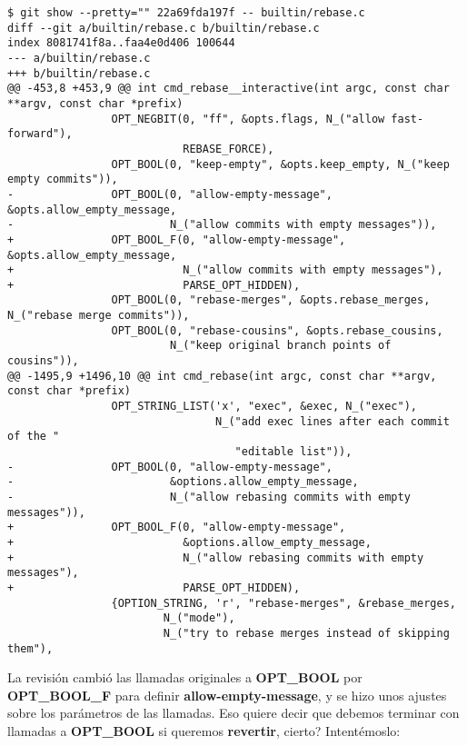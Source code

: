 \begin{lstlisting}[style=console_style,
	basicstyle=\tiny,
	caption={\bf Ejemplo 13} - Revisión original]
$ git show --pretty="" 22a69fda197f -- builtin/rebase.c
diff --git a/builtin/rebase.c b/builtin/rebase.c
index 8081741f8a..faa4e0d406 100644
--- a/builtin/rebase.c
+++ b/builtin/rebase.c
@@ -453,8 +453,9 @@ int cmd_rebase__interactive(int argc, const char **argv, const char *prefix)
                OPT_NEGBIT(0, "ff", &opts.flags, N_("allow fast-forward"),
                           REBASE_FORCE),
                OPT_BOOL(0, "keep-empty", &opts.keep_empty, N_("keep empty commits")),
-               OPT_BOOL(0, "allow-empty-message", &opts.allow_empty_message,
-                        N_("allow commits with empty messages")),
+               OPT_BOOL_F(0, "allow-empty-message", &opts.allow_empty_message,
+                          N_("allow commits with empty messages"),
+                          PARSE_OPT_HIDDEN),
                OPT_BOOL(0, "rebase-merges", &opts.rebase_merges, N_("rebase merge commits")),
                OPT_BOOL(0, "rebase-cousins", &opts.rebase_cousins,
                         N_("keep original branch points of cousins")),
@@ -1495,9 +1496,10 @@ int cmd_rebase(int argc, const char **argv, const char *prefix)
                OPT_STRING_LIST('x', "exec", &exec, N_("exec"),
                                N_("add exec lines after each commit of the "
                                   "editable list")),
-               OPT_BOOL(0, "allow-empty-message",
-                        &options.allow_empty_message,
-                        N_("allow rebasing commits with empty messages")),
+               OPT_BOOL_F(0, "allow-empty-message",
+                          &options.allow_empty_message,
+                          N_("allow rebasing commits with empty messages"),
+                          PARSE_OPT_HIDDEN),
                {OPTION_STRING, 'r', "rebase-merges", &rebase_merges,
                        N_("mode"),
                        N_("try to rebase merges instead of skipping them"),
\end{lstlisting}

La revisión cambió las llamadas originales a {\bf OPT\_BOOL} por {\bf OPT\_BOOL\_F} para definir {\bf allow-empty-message}, y
se hizo unos ajustes sobre los parámetros de las llamadas. Eso quiere decir que debemos terminar con llamadas a {\bf OPT\_BOOL}
si queremos {\bf revertir}, cierto? Intentémoslo:

